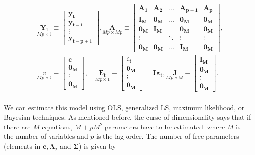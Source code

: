 \begin{align*}
& \underset{M p \times 1}{\bm{Y}_{\bm{t}}} \equiv\left[\begin{array}{c}
\bm{y}_{\bm{t}} \\
\bm{y}_{\bm{t}-\bm{1}} \\
\vdots \\
\bm{y}_{\bm{t}-\bm{p}+1}
\end{array}\right], \underset{M p \times M p}{\bm{A}} \equiv\left[\begin{array}{ccccc}
\bm{A}_{\bm{1}} & \bm{A}_{\bm{2}} & \ldots & \bm{A}_{\bm{p}-\bm{1}} & \bm{A}_{\bm{p}} \\
\bm{I}_{\bm{M}} & \bm{0}_{\bm{M}} & \ldots & \bm{0}_{\bm{M}} & \bm{0}_{\bm{M}} \\
\bm{0}_{\bm{M}} & \bm{I}_{\bm{M}} & & \bm{0}_{\bm{M}} & \bm{0}_{\bm{M}} \\
\vdots & & \ddots & \vdots & \vdots \\
\bm{0}_{\bm{M}} & \bm{0}_{\bm{M}} & \ldots & \bm{I}_{\bm{M}} & \bm{0}_{\bm{M}}
\end{array}\right] , \\
& \underset{M p \times 1}{v} \equiv\left[\begin{array}{c}
\bm{c} \\
\bm{0}_{\bm{M}} \\
\vdots \\
\bm{0}_{\bm{M}}
\end{array}\right], \quad \underset{M p \times 1}{\bm{E}_{\bm{t}}} \equiv\left[\begin{array}{c}
\varepsilon_{\bm{t}} \\
\bm{0}_{\bm{M}} \\
\vdots \\
\bm{0}_{\bm{M}}
\end{array}\right]=\bm{J} \bm{\varepsilon}_{\mathrm{t}}, \underset{M p \times M}{\bm{J}} \equiv\left[\begin{array}{c}
\bm{I}_{\bm{M}} \\
\bm{0}_{\bm{M}} \\
\vdots \\
\bm{0}_{\bm{M}}
\end{array}\right] . \\
&
\end{align*}

We can estimate this model using OLS, generalized LS, maximum likelihood, or Bayesian techniques. As mentioned before, the curse of dimensionality says that if there are $M$ equations, $M+pM^2$ parameters have to be estimated, where $M$ is the number of variables and $p$ is the lag order. The number of free parameters (elements in $\bm{c},\bm{A}_j$ and $\bm{\Sigma}$) is given by


